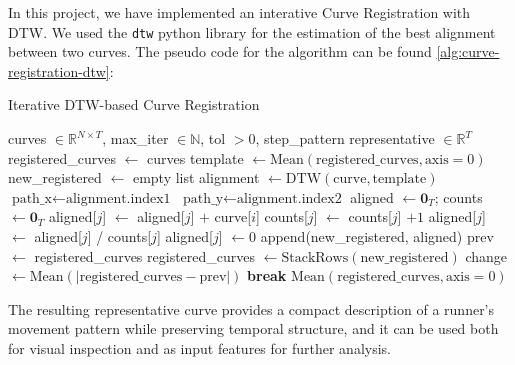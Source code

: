 In this project, we have implemented an interative Curve Registration with DTW. We used the \texttt{dtw} python library \citet{Giorgino2009} for the estimation of the best alignment between two curves. The pseudo code for the algorithm can be found \ref{alg:curve-registration-dtw}:

\begin{algorithm}
\caption{Iterative DTW-based Curve Registration}
\begin{algorithmic}[1]
\Require curves $\in \mathbb{R}^{N \times T}$, max\_iter $\in \mathbb{N}$, tol $> 0$, step\_pattern
\Ensure representative $\in \mathbb{R}^T$
\State registered\_curves $\gets$ curves
    \State template $\gets \mathrm{Mean}(\text{registered\_curves}, \text{axis}=0)$ 
    \State new\_registered $\gets$ empty list
        \State alignment $\gets \mathrm{DTW}(\text{curve}, \text{template})$
        \State $\text{path\_x} \gets \text{alignment.index1}$ 
        \State $\text{path\_y} \gets \text{alignment.index2}$ 
        \State aligned $\gets \mathbf{0}_T$; counts $\gets \mathbf{0}_T$
            \State aligned[$j$] $\gets$ aligned[$j$] $+$ curve[$i$] 
            \State counts[$j$] $\gets$ counts[$j$] $+ 1$
        \EndFor
                \State aligned[$j$] $\gets$ aligned[$j$] / counts[$j$] 
            \Else
                \State aligned[$j$] $\gets 0$
            \EndIf
        \EndFor
        \State append(new\_registered, aligned)
    \EndFor
    \State prev $\gets$ registered\_curves
    \State registered\_curves $\gets \mathrm{StackRows}(\text{new\_registered})$ 
        \State change $\gets \mathrm{Mean}(|\text{registered\_curves} - \text{prev}|)$
            \State \textbf{break}
        \EndIf
    \EndIf
\EndFor
\State \Return $\mathrm{Mean}(\text{registered\_curves}, \text{axis}=0)$
\end{algorithmic}
\end{algorithm}

The resulting representative curve provides a compact description of a runner's movement pattern while preserving temporal structure, and it can be used both for visual inspection and as input features for further analysis.

